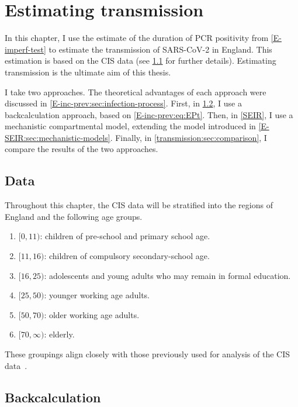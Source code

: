\documentclass[thesis.tex]{subfiles}
\begin{document}
\ifSubfilesClassLoaded{
    \setcounter{chapter}{6}
}

\chapter{Estimating transmission} \label{transmission}

In this chapter, I use the estimate of the duration of PCR positivity from \cref{E-imperf-test} to estimate the transmission of SARS-CoV-2 in England.
This estimation is based on the CIS data (see \cref{transmission:sec:data} for further details).
Estimating transmission is the ultimate aim of this thesis.

I take two approaches.
The theoretical advantages of each approach were discussed in \cref{E-inc-prev:sec:infection-process}.
First, in \cref{backcalc}, I use a backcalculation approach, based on \cref{E-inc-prev:eq:EPt}.
Then, in \cref{SEIR}, I use a mechanistic compartmental model, extending the model introduced in \cref{E-SEIR:sec:mechanistic-models}.
Finally, in \cref{transmission:sec:comparison}, I compare the results of the two approaches.

\section{Data} \label{transmission:sec:data}

Throughout this chapter, the CIS data will be stratified into the regions of England and the following age groups.
\begin{enumerate}
    \item $[0, 11)$: children of pre-school and primary school age.
    \item $[11, 16)$: children of compulsory secondary-school age.
    \item $[16, 25)$: adolescents and young adults who may remain in formal education.
    \item $[25, 50)$: younger working age adults.
    \item $[50, 70)$: older working age adults.
    \item $[70, \infty)$: elderly.
\end{enumerate}
These groupings align closely with those previously used for analysis of the CIS data~\autocites[e.g.:][]{houseInferring}{walkerTracking}.

\section{Backcalculation} \label{backcalc}
\end{document}
